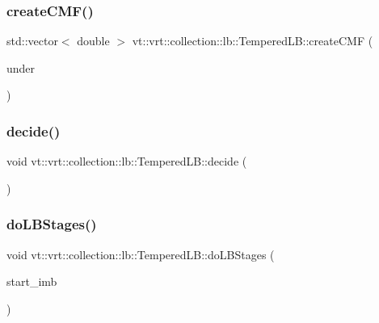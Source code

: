 \subsubsection{\texorpdfstring{create\+C\+M\+F()}{createCMF()}}
{\footnotesize\ttfamily std\+::vector$<$ double $>$ vt\+::vrt\+::collection\+::lb\+::\+Tempered\+L\+B\+::create\+C\+MF (\begin{DoxyParamCaption}\item[{\hyperlink{structvt_1_1vrt_1_1collection_1_1lb_1_1_tempered_l_b_aa18a0edaf10119e307e7209371caa673}{Node\+Set\+Type} const \&}]{under }\end{DoxyParamCaption})\hspace{0.3cm}{\ttfamily [protected]}}

\mbox{\label{structvt_1_1vrt_1_1collection_1_1lb_1_1_tempered_l_b_a099523e70a588de77eec53a36aeeecdf}} 
\subsubsection{\texorpdfstring{decide()}{decide()}}
{\footnotesize\ttfamily void vt\+::vrt\+::collection\+::lb\+::\+Tempered\+L\+B\+::decide (\begin{DoxyParamCaption}{ }\end{DoxyParamCaption})\hspace{0.3cm}{\ttfamily [protected]}}

\mbox{\label{structvt_1_1vrt_1_1collection_1_1lb_1_1_tempered_l_b_a164fa3ad3c312adccd059e3b64e39e8d}} 
\subsubsection{\texorpdfstring{do\+L\+B\+Stages()}{doLBStages()}}
{\footnotesize\ttfamily void vt\+::vrt\+::collection\+::lb\+::\+Tempered\+L\+B\+::do\+L\+B\+Stages (\begin{DoxyParamCaption}\item[{\hyperlink{namespacevt_a876a9d0cd5a952859c72de8a46881442}{Time\+Type}}]{start\+\_\+imb }\end{DoxyParamCaption})\hspace{0.3cm}{\ttfamily [protected]}}


